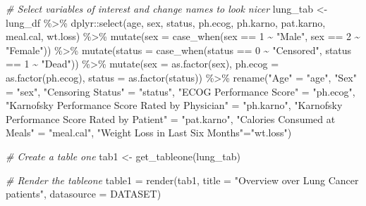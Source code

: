 \documentclass[
]{article}
\newenvironment{Shaded}{\begin{snugshade}}{\end{snugshade}}
\newcommand{\AttributeTok}[1]{\textcolor[rgb]{0.77,0.63,0.00}{#1}}
\newcommand{\CommentTok}[1]{\textcolor[rgb]{0.56,0.35,0.01}{\textit{#1}}}
\newcommand{\DecValTok}[1]{\textcolor[rgb]{0.00,0.00,0.81}{#1}}
\newcommand{\FunctionTok}[1]{\textcolor[rgb]{0.00,0.00,0.00}{#1}}
\newcommand{\NormalTok}[1]{#1}
\newcommand{\OtherTok}[1]{\textcolor[rgb]{0.56,0.35,0.01}{#1}}
\newcommand{\SpecialCharTok}[1]{\textcolor[rgb]{0.00,0.00,0.00}{#1}}
\newcommand{\StringTok}[1]{\textcolor[rgb]{0.31,0.60,0.02}{#1}}
\begin{document}
\begin{Shaded}
\begin{Highlighting}[]
\CommentTok{\# Select variables of interest and change names to look nicer}
\NormalTok{lung\_tab }\OtherTok{\textless{}{-}}\NormalTok{ lung\_df }\SpecialCharTok{\%\textgreater{}\%}  
\NormalTok{  dplyr}\SpecialCharTok{::}\FunctionTok{select}\NormalTok{(age, sex, status, ph.ecog, ph.karno, pat.karno, meal.cal, wt.loss) }\SpecialCharTok{\%\textgreater{}\%}
  \FunctionTok{mutate}\NormalTok{(}\AttributeTok{sex =} \FunctionTok{case\_when}\NormalTok{(sex }\SpecialCharTok{==} \DecValTok{1} \SpecialCharTok{\textasciitilde{}} \StringTok{"Male"}\NormalTok{,}
\NormalTok{                         sex }\SpecialCharTok{==} \DecValTok{2} \SpecialCharTok{\textasciitilde{}} \StringTok{"Female"}\NormalTok{)) }\SpecialCharTok{\%\textgreater{}\%}
  \FunctionTok{mutate}\NormalTok{(}\AttributeTok{status =} \FunctionTok{case\_when}\NormalTok{(status }\SpecialCharTok{==} \DecValTok{0} \SpecialCharTok{\textasciitilde{}} \StringTok{"Censored"}\NormalTok{,}
\NormalTok{                            status }\SpecialCharTok{==} \DecValTok{1} \SpecialCharTok{\textasciitilde{}} \StringTok{"Dead"}\NormalTok{)) }\SpecialCharTok{\%\textgreater{}\%}
  \FunctionTok{mutate}\NormalTok{(}\AttributeTok{sex =} \FunctionTok{as.factor}\NormalTok{(sex),}
         \AttributeTok{ph.ecog =} \FunctionTok{as.factor}\NormalTok{(ph.ecog), }
         \AttributeTok{status =} \FunctionTok{as.factor}\NormalTok{(status)) }\SpecialCharTok{\%\textgreater{}\%}
  \FunctionTok{rename}\NormalTok{(}\StringTok{"Age"} \OtherTok{=} \StringTok{"age"}\NormalTok{, }
         \StringTok{"Sex"} \OtherTok{=} \StringTok{"sex"}\NormalTok{, }
         \StringTok{"Censoring Status"} \OtherTok{=} \StringTok{"status"}\NormalTok{, }
         \StringTok{"ECOG Performance Score"} \OtherTok{=} \StringTok{"ph.ecog"}\NormalTok{, }
         \StringTok{"Karnofsky Performance Score Rated by Physician"} \OtherTok{=} \StringTok{"ph.karno"}\NormalTok{, }
         \StringTok{"Karnofsky Performance Score Rated by Patient"} \OtherTok{=} \StringTok{"pat.karno"}\NormalTok{, }
         \StringTok{"Calories Consumed at Meals"} \OtherTok{=} \StringTok{"meal.cal"}\NormalTok{, }
         \StringTok{"Weight Loss in Last Six Months"}\OtherTok{=}\StringTok{"wt.loss"}\NormalTok{) }

\CommentTok{\# Create a table one}
\NormalTok{tab1 }\OtherTok{\textless{}{-}} \FunctionTok{get\_tableone}\NormalTok{(lung\_tab)}

\CommentTok{\# Render the tableone}
\NormalTok{table1 }\OtherTok{=} \FunctionTok{render}\NormalTok{(tab1, }\AttributeTok{title =} \StringTok{"Overview over Lung Cancer patients"}\NormalTok{, }\AttributeTok{datasource =}\NormalTok{ DATASET)}
\end{Highlighting}
\end{Shaded}
\end{document}
